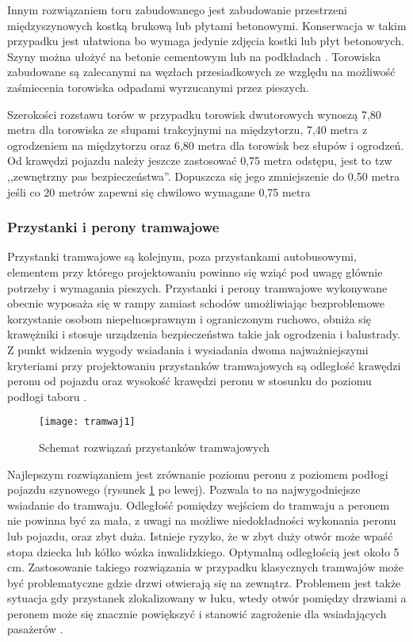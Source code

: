 \documentclass[twoside,12pt]{article}
\begin{document}
	Innym rozwiązaniem toru zabudowanego jest zabudowanie przestrzeni międzyszynowych kostką brukową lub płytami betonowymi. Konserwacja w takim przypadku jest ułatwiona bo wymaga jedynie zdjęcia kostki lub płyt betonowych. Szyny można ułożyć na betonie cementowym lub na podkładach \cite{czauderna}. Torowiska zabudowane są zalecanymi na węzłach przesiadkowych ze względu na możliwość zaśmiecenia torowiska odpadami wyrzucanymi przez pieszych.
	
	Szerokości rozstawu torów w przypadku torowisk dwutorowych wynoszą 7,80 metra dla torowiska ze słupami trakcyjnymi na międzytorzu, 7,40 metra z ogrodzeniem na międzytorzu oraz 6,80 metra dla torowisk bez słupów i ogrodzeń. Od krawędzi pojazdu należy jeszcze zastosować 0,75 metra odstępu, jest to tzw ,,zewnętrzny pas bezpieczeństwa''. Dopuszcza się jego zmniejszenie do 0,50 metra jeśli co 20 metrów zapewni się chwilowo wymagane 0,75 metra \cite{oleksiewicz}
	
	\clearpage
	\subsubsection{Przystanki i perony tramwajowe}
	Przystanki tramwajowe są kolejnym, poza przystankami autobusowymi, elementem przy którego projektowaniu powinno się wziąć pod uwagę głównie potrzeby i wymagania pieszych. Przystanki i perony tramwajowe wykonywane obecnie wyposaża się w rampy zamiast schodów umożliwiając bezproblemowe korzystanie osobom niepełnosprawnym i ograniczonym ruchowo, obniża się krawężniki i stosuje urządzenia bezpieczeństwa takie jak ogrodzenia i balustrady. Z punkt widzenia wygody wsiadania i wysiadania dwoma najważniejszymi kryteriami przy projektowaniu przystanków tramwajowych są odległość krawędzi peronu od pojazdu oraz wysokość krawędzi peronu w stosunku do poziomu podłogi taboru \cite{makuch2}. 
	
		\begin{figure}[H]
		\centering
		\texttt{[image: tramwaj1]}\\
		\caption{Schemat rozwiązań przystanków tramwajowych}
		\label{tramwaj1}
	\end{figure}
	
	Najlepszym rozwiązaniem jest zrównanie poziomu peronu z poziomem podłogi pojazdu szynowego (rysunek \ref{tramwaj1} po lewej). Pozwala to na najwygodniejsze wsiadanie do tramwaju. Odległość pomiędzy wejściem do tramwaju a peronem nie powinna być za mała, z uwagi na możliwe niedokładności wykonania peronu lub pojazdu, oraz zbyt duża. Istnieje ryzyko, że w zbyt duży otwór może wpaść stopa dziecka lub kółko wózka inwalidzkiego. Optymalną odległością jest około 5 cm. Zastosowanie takiego rozwiązania w przypadku klasycznych tramwajów może być problematyczne gdzie drzwi otwierają się na zewnątrz. Problemem jest także sytuacja gdy przystanek zlokalizowany w łuku, wtedy otwór pomiędzy drzwiami a peronem może się znacznie powiększyć i stanowić zagrożenie dla wsiadających pasażerów \cite{makuch2}.
	
\end{document}

